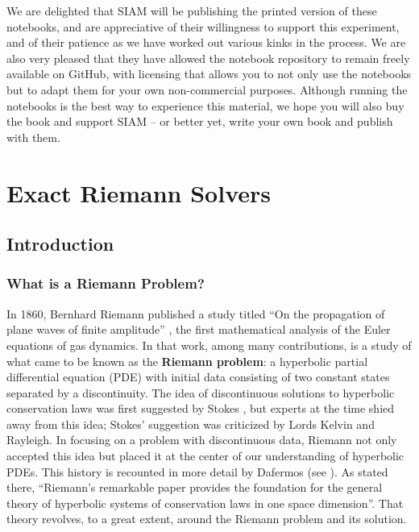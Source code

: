 \documentclass{SIAMbook2016}
\begin{document}
We are delighted that SIAM will be publishing the printed version of
these notebooks, and are appreciative of their willingness to support
this experiment, and of their patience as we have worked out various
kinks in the process. We are also very pleased that they have allowed
the notebook repository to remain freely available on GitHub, with
licensing that allows you to not only use the notebooks but to adapt
them for your own non-commercial purposes. Although running the
notebooks is the best way to experience this material, we hope you will
also buy the book and support SIAM -- or better yet, write your own book
and publish with them.

\mainmatter

\part{Exact Riemann Solvers}

\hypertarget{introduction}{%
\chapter{Introduction}\label{introduction}}
\label{sec:01-Introduction}
\hypertarget{what-is-a-riemann-problem}{%
\section{What is a Riemann Problem?}\label{what-is-a-riemann-problem}}

In 1860, Bernhard Riemann published a study titled ``On the propagation
of plane waves of finite amplitude'' \cite{riemann1860fortpflanzung},
the first mathematical analysis of the Euler equations of gas dynamics.
In that work, among many contributions, is a study of what came to be
known as the \textbf{Riemann problem}: a hyperbolic partial differential
equation (PDE) with initial data consisting of two constant states
separated by a discontinuity. The idea of discontinuous solutions to
hyperbolic conservation laws was first suggested by Stokes
\cite{stokes1848liv}, but experts at the time shied away from this idea;
Stokes' suggestion was criticized by Lords Kelvin and Rayleigh. In
focusing on a problem with discontinuous data, Riemann not only accepted
this idea but placed it at the center of our understanding of hyperbolic
PDEs. This history is recounted in more detail by Dafermos (see
\cite{dafermos2010hyperbolic}). As stated there, ``Riemann's remarkable
paper provides the foundation for the general theory of hyperbolic
systems of conservation laws in one space dimension''. That theory
revolves, to a great extent, around the Riemann problem and its
solution.
\end{document}
